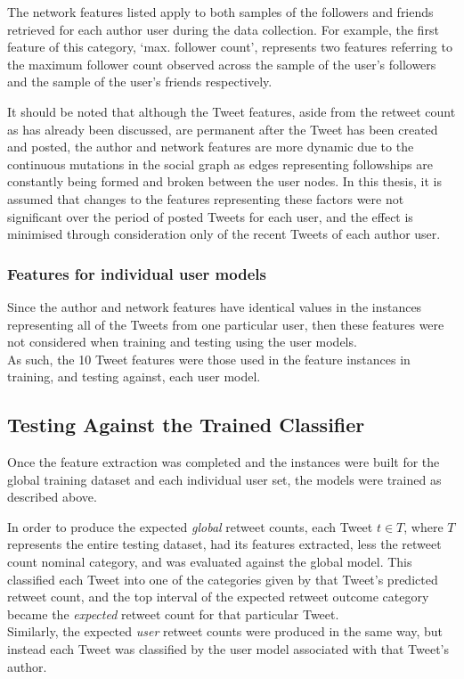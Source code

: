 The network features listed apply to both samples of the followers and friends retrieved for each author user during the data collection. For example, the first feature of this category, `max. follower count', represents two features referring to the maximum follower count observed across the sample of the user's followers and the sample of the user's friends respectively.

It should be noted that although the Tweet features, aside from the retweet count as has already been discussed, are permanent after the Tweet has been created and posted, the author and network features are more dynamic due to the continuous mutations in the social graph as edges representing followships are constantly being formed and broken between the user nodes. In this thesis, it is assumed that changes to the features representing these factors were not significant over the period of posted Tweets for each user, and the effect is minimised through consideration only of the recent Tweets of each author user.


\subsubsection{Features for individual user models}
Since the author and network features have identical values in the instances representing all of the Tweets from one particular user, then these features were not considered when training and testing using the user models.\\
As such, the 10 Tweet features were those used in the feature instances in training, and testing against, each user model.

 

\subsection{Testing Against the Trained Classifier}
Once the feature extraction was completed and the instances were built for the global training dataset and each individual user set, the models were trained as described above.

In order to produce the expected \textit{global} retweet counts, each Tweet $t \in T$, where $T$ represents the entire testing dataset, had its features extracted, less the retweet count nominal category, and was evaluated against the global model. This classified each Tweet into one of the categories given by that Tweet's predicted retweet count, and the top interval of the expected retweet outcome category became the \textit{expected} retweet count for that particular Tweet.\\
Similarly, the expected \textit{user} retweet counts were produced in the same way, but instead each Tweet was classified by the user model associated with that Tweet's author.

